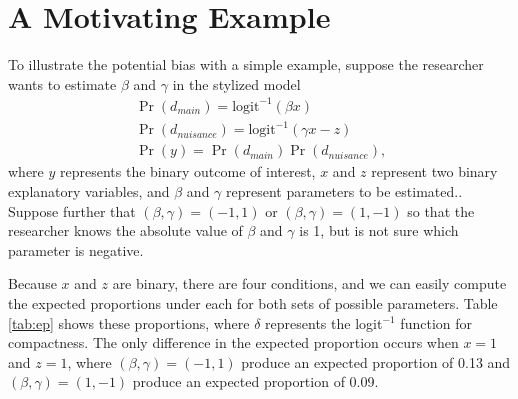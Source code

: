 \documentclass[10pt]{article}
\begin{document}
\section*{A Motivating Example}

To illustrate the potential bias with a simple example, suppose the researcher wants to estimate $\beta$ and $\gamma$ in the stylized model
\begin{gather*}
\Pr(d_{main}) = \text{logit}^{-1}(\beta x)\nonumber\\
\Pr(d_{nuisance}) = \text{logit}^{-1}(\gamma x - z)\nonumber\\
\Pr(y) = \Pr(d_{main})\Pr(d_{nuisance})\text{,}\nonumber
\end{gather*}
where $y$ represents the binary outcome of interest, $x$ and $z$ represent two binary explanatory variables, and $\beta$ and $\gamma$ represent parameters to be estimated.. 
Suppose further that $(\beta, \gamma) = (-1, 1)$ or $(\beta, \gamma) = (1, -1)$ so that the researcher knows the absolute value of $\beta$ and $\gamma$ is 1, but is not sure which parameter is negative.

Because $x$ and $z$ are binary, there are four conditions, and we can easily compute the expected proportions under each for both sets of possible parameters. 
Table \ref{tab:ep} shows these proportions, where $\delta$ represents the logit$^{-1}$ function for compactness. 
The only difference in the expected proportion occurs when $x = 1$ and $z = 1$, where $(\beta, \gamma) = (-1, 1)$ produce an expected proportion of 0.13 and $(\beta, \gamma) = (1, -1)$ produce an expected proportion of 0.09.
\end{document}
